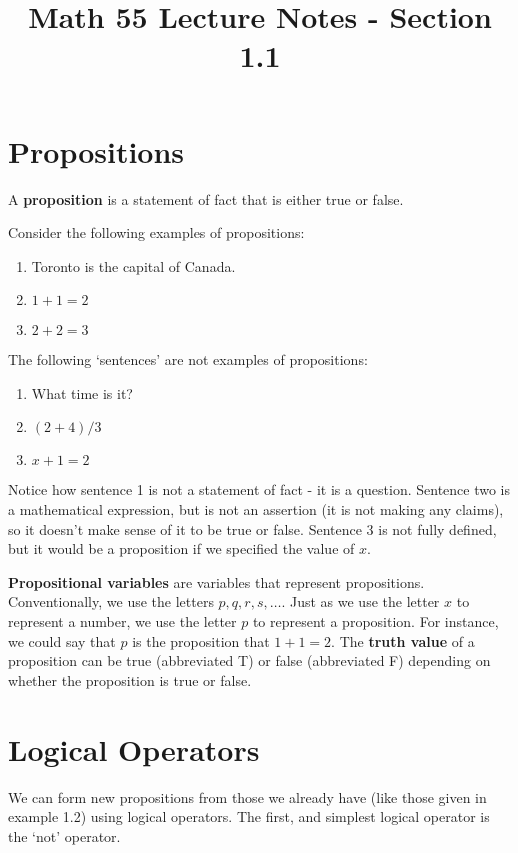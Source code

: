 \documentclass[12t]{scrartcl}
\title{Math 55 Lecture Notes - Section 1.1}
\author{\vspace{-8ex}}
\date{\vspace{-8ex}}
\theoremstyle{plain}
\theoremstyle{definition}
\begin{document}
\maketitle

\section{Propositions}

 A \textbf{proposition} is a statement of fact that is either true or false.

\example Consider the following examples of propositions:
\begin{enumerate}[nosep]
	\item Toronto is the capital of Canada.
	\item $1+1=2$
	\item $2+2=3$
\end{enumerate}

\example The following `sentences' are not examples of propositions:
\begin{enumerate}[nosep]
	\item What time is it?
	\item $(2+4)/3$
	\item $x+1=2$
\end{enumerate}

\vspace{.25cm}
Notice how sentence 1 is not a statement of fact - it is a question. Sentence two is a mathematical expression, but is not an assertion (it is not making any claims), so it doesn't make sense of it to be true or false. Sentence $3$ is not fully defined, but it would be a proposition if we specified the value of $x$.

\textbf{Propositional variables} are variables that represent propositions. Conventionally, we use the letters $p,q,r,s,\dots$. Just as we use the letter $x$ to represent a number, we use the letter $p$ to represent a proposition. For instance, we could say that $p$ is the proposition that $1+1=2$. The \textbf{truth value} of a proposition can be true (abbreviated T) or false (abbreviated F) depending on whether the proposition is true or false.

\section{Logical Operators}

We can form new propositions from those we already have (like those given in example 1.2) using logical operators. The first, and simplest logical operator is the `not' operator.
\end{document}
